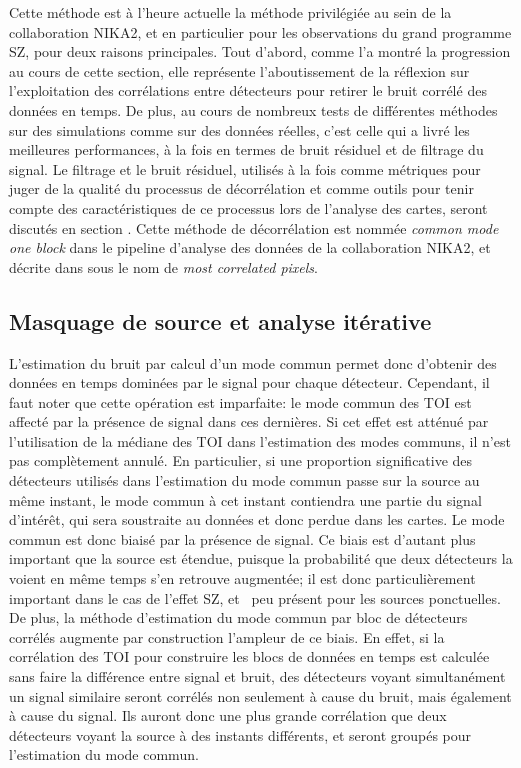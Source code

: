 Cette méthode est à l'heure actuelle la méthode privilégiée au sein de la collaboration NIKA2, et en particulier pour les observations du grand programme SZ, pour deux raisons principales.
Tout d'abord, comme l'a montré la progression au cours de cette section, elle représente l'aboutissement de la réflexion sur l'exploitation des corrélations entre détecteurs pour retirer le bruit corrélé des données en temps.
De plus, au cours de nombreux tests de différentes méthodes sur des simulations comme sur des données réelles, c'est celle qui a livré les meilleures performances, à la fois en termes de bruit résiduel et de filtrage du signal.
Le filtrage et le bruit résiduel, utilisés à la fois comme métriques pour juger de la qualité du processus de décorrélation et comme outils pour tenir compte des caractéristiques de ce processus lors de l'analyse des cartes, seront discutés en section .
Cette méthode de décorrélation est nommée \textit{common mode one block} dans le pipeline d'analyse des données de la collaboration NIKA2, et décrite dans \cite{perotto_calibration_2020} sous le nom de \textit{most correlated pixels}.

\subsection{Masquage de source et analyse itérative}\label{sec:mask_decor}

L'estimation du bruit par calcul d'un mode commun permet donc d'obtenir des données en temps dominées par le signal pour chaque détecteur.
Cependant, il faut noter que cette opération est imparfaite: le mode commun des TOI est affecté par la présence de signal dans ces dernières.
Si cet effet est atténué par l'utilisation de la médiane des TOI dans l'estimation des modes communs, il n'est pas complètement annulé.
En particulier, si une proportion significative des détecteurs utilisés dans l'estimation du mode commun passe sur la source au même instant, le mode commun à cet instant contiendra une partie du signal d'intérêt, qui sera soustraite au données et donc perdue dans les cartes.
Le mode commun est donc biaisé par la présence de signal.
Ce biais est d'autant plus important que la source est étendue, puisque la probabilité que deux détecteurs la voient en même temps s'en retrouve augmentée; il est donc particulièrement important dans le cas de l'effet SZ, et \prior\ peu présent pour les sources ponctuelles.
De plus, la méthode d'estimation du mode commun par bloc de détecteurs corrélés augmente par construction l'ampleur de ce biais.
En effet, si la corrélation des TOI pour construire les blocs de données en temps est calculée sans faire la différence entre signal et bruit, des détecteurs voyant simultanément un signal similaire seront corrélés non seulement à cause du bruit, mais également à cause du signal.
Ils auront donc une plus grande corrélation que deux détecteurs voyant la source à des instants différents, et seront groupés pour l'estimation du mode commun.

